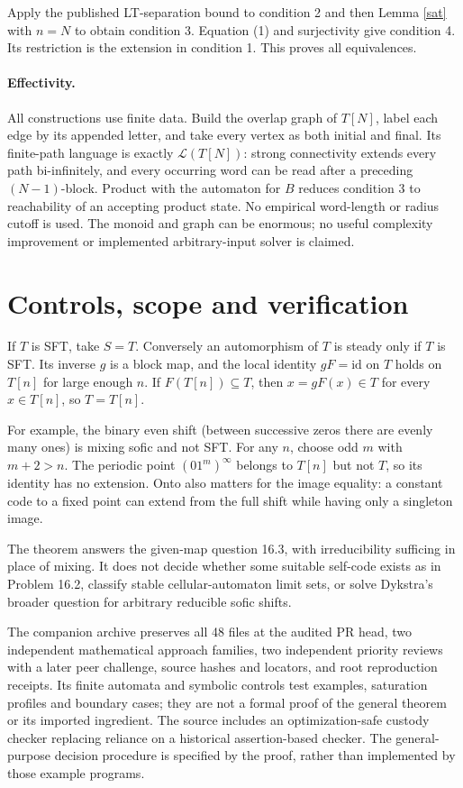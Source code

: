 \documentclass[11pt]{article}
\newcommand{\Lang}{\mathcal L}
\begin{document}
Apply the published LT-separation bound to condition 2 and then
Lemma \ref{sat} with $n=N$ to obtain condition 3. Equation (1) and
surjectivity give condition 4. Its restriction is the extension in
condition 1. This proves all equivalences.

\paragraph{Effectivity.}
All constructions use finite data. Build the overlap graph of $T[N]$,
label each edge by its appended letter, and take every vertex as both
initial and final. Its finite-path language is exactly
$\Lang(T[N])$: strong connectivity extends every path bi-infinitely,
and every occurring word can be read after a preceding $(N-1)$-block.
Product with the automaton for $B$ reduces condition 3 to reachability
of an accepting product state. No empirical word-length or radius
cutoff is used. The monoid and graph can be enormous; no useful
complexity improvement or implemented arbitrary-input solver is claimed.

\section{Controls, scope and verification}
If $T$ is SFT, take $S=T$. Conversely an automorphism of $T$ is steady
only if $T$ is SFT. Its inverse $g$ is a block map, and the local identity
$gF=\mathrm{id}$ on $T$ holds on $T[n]$ for large enough $n$.
If $F(T[n])\subseteq T$, then $x=gF(x)\in T$ for every $x\in T[n]$,
so $T=T[n]$.

For example, the binary even shift (between successive zeros there are
evenly many ones) is mixing sofic and not SFT. For any $n$, choose odd
$m$ with $m+2>n$. The periodic point $(01^m)^\infty$ belongs to $T[n]$
but not $T$, so its identity has no extension. Onto also matters for
the image equality: a constant code to a fixed point can extend from
the full shift while having only a singleton image.

The theorem answers the given-map question 16.3, with irreducibility
sufficing in place of mixing. It does not decide whether some suitable
self-code exists as in Problem 16.2, classify stable cellular-automaton
limit sets, or solve Dykstra's broader question for arbitrary reducible
sofic shifts.

The companion archive preserves all 48 files at the audited PR head,
two independent mathematical approach families, two independent
priority reviews with a later peer challenge, source hashes and
locators, and root reproduction receipts. Its finite automata and
symbolic controls test examples, saturation profiles and boundary
cases; they are not a formal proof of the general theorem or its
imported ingredient. The source includes an optimization-safe custody
checker replacing reliance on a historical assertion-based checker.
The general-purpose decision procedure is specified by the proof,
rather than implemented by those example programs.
\end{document}
